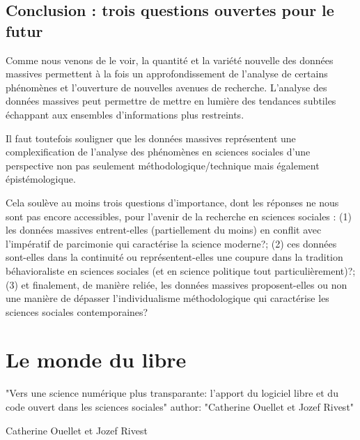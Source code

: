 \documentclass[
  letterpaper,
]{scrbook}
\begin{document}
\hypertarget{conclusion-trois-questions-ouvertes-pour-le-futur}{%
\section{Conclusion : trois questions ouvertes pour le
futur}\label{conclusion-trois-questions-ouvertes-pour-le-futur}}

Comme nous venons de le voir, la quantité et la variété nouvelle des
données massives permettent à la fois un approfondissement de l'analyse
de certains phénomènes et l'ouverture de nouvelles avenues de recherche.
L'analyse des données massives peut permettre de mettre en lumière des
tendances subtiles échappant aux ensembles d'informations plus
restreints.

Il faut toutefois souligner que les données massives représentent une
complexification de l'analyse des phénomènes en sciences sociales d'une
perspective non pas seulement méthodologique/technique mais également
épistémologique.

Cela soulève au moins trois questions d'importance, dont les réponses ne
nous sont pas encore accessibles, pour l'avenir de la recherche en
sciences sociales : (1) les données massives entrent-elles
(partiellement du moins) en conflit avec l'impératif de parcimonie qui
caractérise la science moderne?; (2) ces données sont-elles dans la
continuité ou représentent-elles une coupure dans la tradition
béhavioraliste en sciences sociales (et en science politique tout
particulièrement)?; (3) et finalement, de manière reliée, les données
massives proposent-elles ou non une manière de dépasser l'individualisme
méthodologique qui caractérise les sciences sociales contemporaines?


\hypertarget{le-monde-du-libre}{%
\chapter{Le monde du libre}\label{le-monde-du-libre}}

\begin{center}

"Vers une science numérique plus transparante: l'apport du logiciel libre et du code ouvert dans les sciences sociales"
author: "Catherine Ouellet et Jozef Rivest"

Catherine Ouellet et Jozef Rivest

\end{center}
\end{document}
